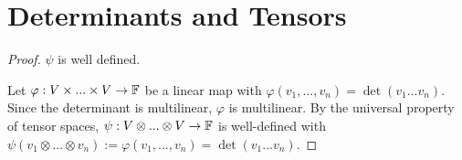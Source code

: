 \section{Determinants and Tensors}

\begin{proof} $\psi$ is well defined.\gap

    Let $\varphi: V \times ... \times V \rightarrow \mathbb{F}$ 
    be a linear map with $\varphi(v_1,...,v_n) = \det(v_1 ... v_n)$.
    Since the determinant is multilinear, $\varphi$ is multilinear.
    By the universal property of tensor spaces,
    $\psi: V \otimes ... \otimes V \rightarrow \mathbb{F}$ is well-defined
    with $\psi(v_1 \otimes ... \otimes v_n) := \varphi(v_1,...,v_n) = \det(v_1 ... v_n)$.
\end{proof}